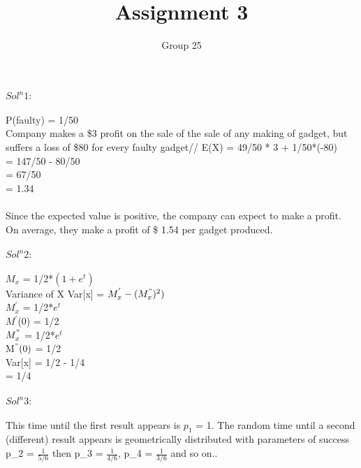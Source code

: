 \documentclass{article}
\title{Assignment 3}
\author{Group 25}
\begin{document}
\maketitle

\textbf{$Sol^n 1:$} \\\\
P(faulty) = 1/50 \\
Company makes a  \$3 profit on the sale of the sale of any making of gadget, but suffers a loss of   \$80 for every faulty gadget//
E(X) = 49/50 * 3 + 1/50*(-80) \\
     = 147/50 - 80/50 \\
     = 67/50 \\
     = 1.34 \\\\
Since the expected value is positive, the company can expect to make a profit. On average, they make a profit of  \$ 1.54 per gadget produced. \\\\
\textbf{$Sol^n 2:$} \\\\
$M_{x}$ = 1/2*$(1 + e^{t})$\\
Variance of X Var[x] = $M_{x}^{'} - (M_{x}^{"})^{2})$\\
 $M_{x}^{'}$ = 1/2*$e^{t}$ \\   
 $M^{'}$(0) = 1/2\\
 $M_{x}^{"}$ = 1/2*$e^{t}$ \\
 M$^{"}(0)$ = 1/2\\
 Var[x] = 1/2 - 1/4\\
 \hfill      = 1/4\\\\
 \textbf{$Sol^n 3:$} \\\\
This time until the first result appears is $p_1$ = 1. The random time until a second (different)
result appears is geometrically distributed with parameters of success p_2 = $\frac{1}{5/6}$ then p_3 = $\frac{1}{4/6}$, p_4 = $\frac{1}{3/6}$ and so on..\\
\end{document}
